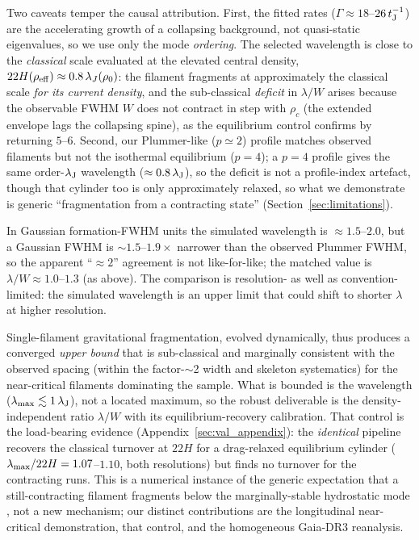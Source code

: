 \documentclass[usenatbib,twoside,twocolumn]{mnras}
\begin{document}
Two caveats temper the causal attribution. First, the fitted rates ($\Gamma\approx18$--$26\,t_{\rm J}^{-1}$) are the accelerating growth of a collapsing background, not quasi-static eigenvalues, so we use only the mode \emph{ordering}. The selected wavelength is close to the \emph{classical} scale evaluated at the elevated central density, $22H(\rho_{\rm eff})\approx0.8\,\lambda_J(\rho_0)$: the filament fragments at approximately the classical scale \emph{for its current density}, and the sub-classical \emph{deficit} in $\lambda/W$ arises because the observable FWHM $W$ does not contract in step with $\rho_c$ (the extended envelope lags the collapsing spine), as the equilibrium control confirms by returning $5$--$6$. Second, our Plummer-like ($p\simeq2$) profile matches observed filaments but not the isothermal equilibrium ($p=4$); a $p=4$ profile gives the same order-$\lambda_{\rm J}$ wavelength ($\approx0.8\,\lambda_{\rm J}$), so the deficit is not a profile-index artefact, though that cylinder too is only approximately relaxed, so what we demonstrate is generic ``fragmentation from a contracting state'' (Section~\ref{sec:limitations}).

In Gaussian formation-FWHM units the simulated wavelength is $\approx1.5$--$2.0$, but a Gaussian FWHM is $\sim1.5$--$1.9\times$ narrower than the observed Plummer FWHM, so the apparent ``$\approx2$'' agreement is not like-for-like; the matched value is $\lambda/W\approx1.0$--$1.3$ (as above). The comparison is resolution- as well as convention-limited: the simulated wavelength is an upper limit that could shift to shorter $\lambda$ at higher resolution.

Single-filament gravitational fragmentation, evolved dynamically, thus produces a converged \emph{upper bound} that is sub-classical and marginally consistent with the observed spacing (within the factor-$\sim$2 width and skeleton systematics) for the near-critical filaments dominating the sample. What is bounded is the wavelength ($\lambda_{\rm max}\lesssim1\,\lambda_{\rm J}$), not a located maximum, so the robust deliverable is the density-independent ratio $\lambda/W$ with its equilibrium-recovery calibration. That control is the load-bearing evidence (Appendix~\ref{sec:val_appendix}): the \emph{identical} pipeline recovers the classical turnover at $22H$ for a drag-relaxed equilibrium cylinder ($\lambda_{\rm max}/22H=1.07$--$1.10$, both resolutions) but finds no turnover for the contracting runs. This is a numerical instance of the generic expectation that a still-contracting filament fragments below the marginally-stable hydrostatic mode \citep{Clarke2016,Clarke2017,Clarke2020}, not a new mechanism; our distinct contributions are the longitudinal near-critical demonstration, that control, and the homogeneous Gaia-DR3 reanalysis.
\end{document}
